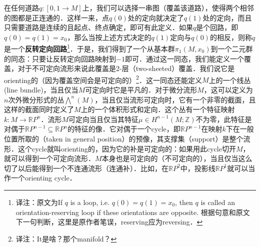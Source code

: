 



在任何道路$q:[0, 1\to M]$上，我们可以选择一串图（覆盖该道路），使得两个相邻的图都是正连通的．这样一来，点$q(0)$处的定向就决定了$q(1)$处的定向，而且只需要道路是连续的且起点、终点确定，即可有此定义．如果$q$是个回路，即$q(0)=q(1)=x_0$，那么当按上述方式决定的$q(1)$定向与$q(0)$的相反，则称$q$是一个\textbf{反转定向回路}\footnote{译注：原文为If $q$ is a loop, i.e. $q(0)=q(1)=x_0$, then $q$ is called an orientation-reserving loop if these orientations are opposite. 根据句意和原文下一句判断，这里是原作者笔误，reserving应为reversing．}．于是，我们得到了一个从基本群$\pi_1(M, x_0)$到一个二元群的同态：只要让反转定向回路映射到$-1$即可．通过这一同态，我们能定义一个覆盖，对于不可定向流形来说此覆盖是2-层（two-sheeted）覆盖．我们说它是orienting的（因为覆盖空间会是可定向的）\footnote{译注：It是啥？那个manifold？}．这一同态还能定义$M$上的一个线丛(line bundle)，当且仅当$M$可定向时它是平凡的．对于微分流形$M$，这可以定义为$n$次外微分形式的丛$\bigwedge^n(M)$，当且仅当流形可定向时，它有一个非零的截面，且这样的截面同时定义了$M$上的一个体积形式和定向．这个丛有一个特征映射$k:M\to \mathbb{R}P^n$．流形$M$可定向当且仅当其特征$\mu\in H^{n-1}(M; \mathbb{Z})$不为零，此特征是对偶于$\mathbb{R}P^{n-1}\subseteq \mathbb{R}P^{n}$的特征的像．它对偶于一个cycle，即$\mathbb{R}P^{n-1}$在映射$k$下在一般位置所取的（taken in general position）的预像，其支撑集（support）是整个流形．这个cycle就叫orienting的，因为它的补是可定向的：如果用此cycle切开$M$，就可以得到一个可定向流形．$M$本身也是可定向的（不可定向的），当且仅当这么切了以后能得到一个不连通流形（连通补）．比如，在$\mathbb{R}P^2$中，投影线$\mathbb{R}P^1$就可以当作一个orienting cycle．


